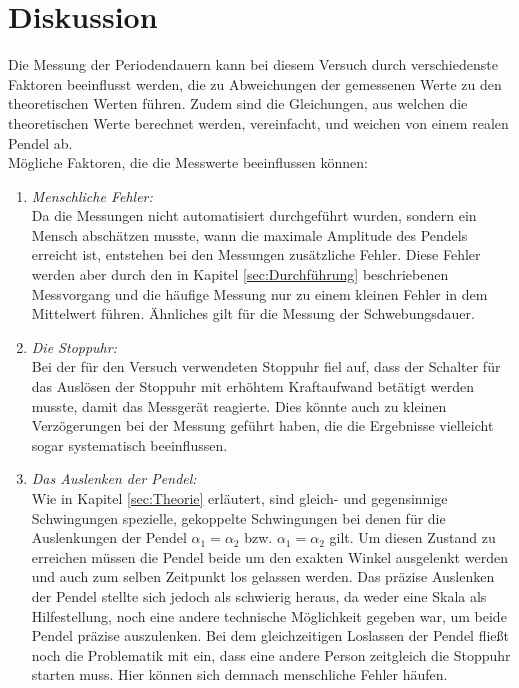 \section{Diskussion}
\label{sec:Diskussion}

Die Messung der Periodendauern kann bei diesem Versuch durch verschiedenste Faktoren beeinflusst werden, die zu Abweichungen
der gemessenen Werte zu den theoretischen Werten führen. Zudem sind die Gleichungen, aus welchen die theoretischen Werte
berechnet werden, vereinfacht, und weichen von einem realen Pendel ab.\\
Mögliche Faktoren, die die Messwerte beeinflussen können:
\begin{enumerate}
    \item \textit{Menschliche Fehler:}\\
        Da die Messungen nicht automatisiert durchgeführt wurden, sondern ein Mensch abschätzen musste, wann die maximale
        Amplitude des Pendels erreicht ist, entstehen bei den Messungen zusätzliche Fehler. Diese Fehler werden aber durch den in Kapitel
        \ref{sec:Durchführung} beschriebenen Messvorgang und die häufige Messung nur zu einem kleinen Fehler in dem Mittelwert
        führen. Ähnliches gilt für die Messung der Schwebungsdauer.
    \item \textit{Die Stoppuhr:}\\
        Bei der für den Versuch verwendeten Stoppuhr fiel auf, dass der Schalter für das Auslösen der Stoppuhr mit erhöhtem
        Kraftaufwand betätigt werden musste, damit das Messgerät reagierte. Dies könnte auch zu kleinen Verzögerungen bei der
        Messung geführt haben, die die Ergebnisse vielleicht sogar systematisch beeinflussen.
    \item \textit{Das Auslenken der Pendel:}\\
        Wie in Kapitel \ref{sec:Theorie} erläutert, sind gleich- und gegensinnige Schwingungen spezielle, gekoppelte Schwingungen bei
        denen für die Auslenkungen der Pendel $\alpha_1=\alpha_2$ bzw. $\alpha_1=\alpha_2$ gilt. Um diesen Zustand zu erreichen
        müssen die Pendel beide um den exakten Winkel ausgelenkt werden und auch zum selben Zeitpunkt los gelassen werden. Das
        präzise Auslenken der Pendel stellte sich jedoch als schwierig heraus, da weder eine Skala als Hilfestellung, noch
        eine andere technische Möglichkeit gegeben war, um beide Pendel präzise auszulenken. Bei dem gleichzeitigen Loslassen
        der Pendel fließt noch die Problematik mit ein, dass eine andere Person zeitgleich die Stoppuhr starten muss. Hier
        können sich demnach menschliche Fehler häufen.
\end{enumerate}
